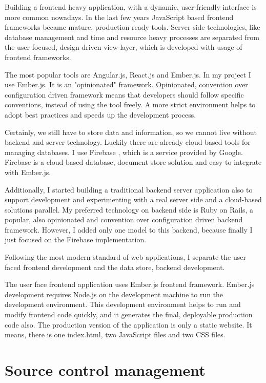 \documentclass[11pt, a4paper, oneside, openright, medskipamount]{report}
\begin{document}
Building a frontend heavy application, with a dynamic, user-friendly interface is more common nowadays. In the last few years JavaScript based frontend frameworks became mature, production ready tools. Server side technologies, like database management and time and resource heavy processes are separated from the user focused, design driven view layer, which is developed with usage of frontend frameworks.

The most popular tools are Angular.js, React.js and Ember.js. In my project I use Ember.js. It is an "opinionated" framework. Opinionated, convention over configuration driven framework means that developers should follow specific conventions, instead of using the tool freely. A more strict environment helps to adopt best practices and speeds up the development process.

Certainly, we still have to store data and information, so we cannot live without backend and server technology. Luckily there are already cloud-based tools for managing databases. I use Firebase \cite{firebase}, which is a service provided by Google. Firebase is a cloud-based database, document-store solution and easy to integrate with Ember.js.

Additionally, I started building a traditional backend server application also to support development and experimenting with a real server side and a cloud-based solutions parallel. My preferred technology on backend side is Ruby on Rails, a popular, also opinionated and convention over configuration driven backend framework. However, I added only one model to this backend, because finally I just focused on the Firebase implementation.

Following the most modern standard of web applications, I separate the user faced frontend development and the data store, backend development.

The user face frontend application uses Ember.js frontend framework. Ember.js development requires Node.js on the development machine to run the development environment. This development environment helps to run and modify frontend code quickly, and it generates the final, deployable production code also. The production version of the application is only a static website. It means, there is one index.html, two JavaScript files and two CSS files.

\section{Source control management}
\end{document}
